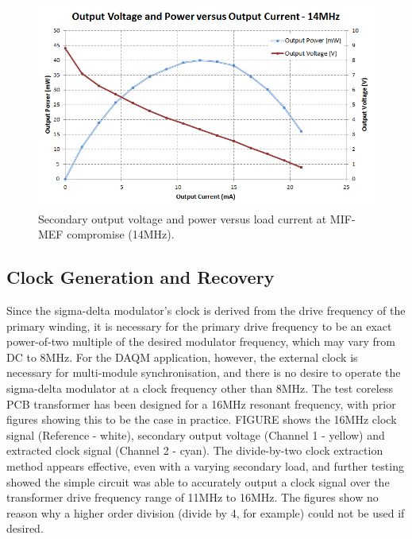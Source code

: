 \documentclass[conference]{IEEEtran}
\begin{document}
	\begin{figure}[t]
		\centering
		\includegraphics[width=1\columnwidth]{./img/VandPvsI_retuned}
		\caption{Secondary output voltage and power versus load current at MIF-MEF compromise (14MHz).}
		\label{fig:VanndPvsI_retuned}
	\end{figure}
	
	\subsection{Clock Generation and Recovery}
	Since the sigma-delta modulator's clock is derived from the drive frequency of the primary winding, it is necessary for the primary drive frequency to be an exact power-of-two multiple of the desired modulator frequency, which may vary from DC to 8MHz.  For the DAQM application, however, the external clock is necessary for multi-module synchronisation, and there is no desire to operate the sigma-delta modulator at a clock frequency other than 8MHz.  The test coreless PCB transformer has been designed for a 16MHz resonant frequency, with prior figures showing this to be the case in practice.  FIGURE shows the 16MHz clock signal (Reference - white), secondary output voltage (Channel 1 - yellow) and extracted clock signal (Channel 2 - cyan).  The divide-by-two clock extraction method appears effective, even with a varying secondary load, and further testing showed the simple circuit was able to accurately output a clock signal over the transformer drive frequency range of 11MHz to 16MHz.  The figures show no reason why a higher order division (divide by 4, for example) could not be used if desired.
	
\end{document}
